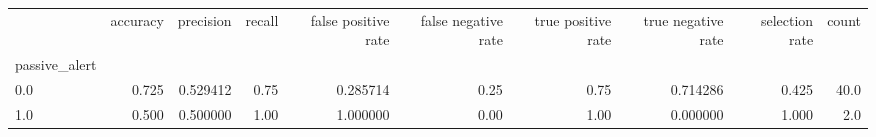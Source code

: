 \begin{tabular}{lrrrrrrrrr}
\toprule
{} &  accuracy &  precision &  recall &  false positive rate &  false negative rate &  true positive rate &  true negative rate &  selection rate &  count \\
passive\_alert &           &            &         &                      &                      &                     &                     &                 &        \\
\midrule
0.0           &     0.725 &   0.529412 &    0.75 &             0.285714 &                 0.25 &                0.75 &            0.714286 &           0.425 &   40.0 \\
1.0           &     0.500 &   0.500000 &    1.00 &             1.000000 &                 0.00 &                1.00 &            0.000000 &           1.000 &    2.0 \\
\bottomrule
\end{tabular}
